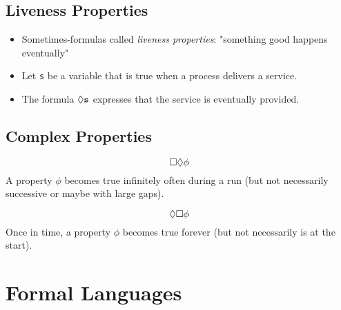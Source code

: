 		\subsection{Liveness Properties}
			\begin{itemize}
				\item Sometimes-formulas called \textit{liveness properties}: "something good happens eventually"
				\item Let \texttt{s} be a variable that is true when a process delivers a service.
				\item The formula \( \lozenge \texttt{s} \) expresses that the service is eventually provided.
			\end{itemize}
		
		\subsection{Complex Properties}
			\begin{equation*}
				\square \lozenge \phi
			\end{equation*}
			A property \(\phi\) becomes true infinitely often during a run (but not necessarily successive or maybe with large gaps).
			
			\begin{equation*}
				\lozenge \square \phi
			\end{equation*}
			Once in time, a property \(\phi\) becomes true forever (but not necessarily is at the start).

	\section{Formal Languages}
		

